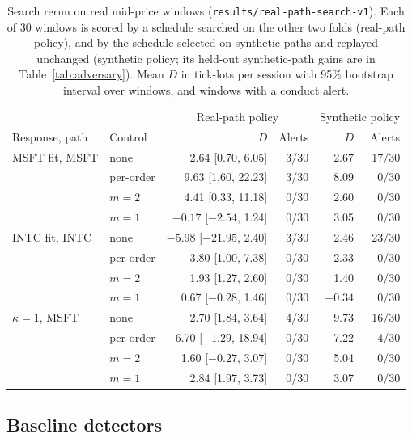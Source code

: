 \documentclass{article}
\begin{document}
\begin{table}[t]
\centering
\caption{Search rerun on real mid-price windows (\texttt{results/real-path-search-v1}). Each of 30 windows is scored by a schedule searched on the other two folds (real-path policy), and by the schedule selected on synthetic paths and replayed unchanged (synthetic policy; its held-out synthetic-path gains are in Table~\ref{tab:adversary}). Mean $D$ in tick-lots per session with 95\% bootstrap interval over windows, and windows with a conduct alert.}\label{tab:realsearch}
\begin{tabular}{llrrrr}
\toprule
 & & \multicolumn{2}{c}{Real-path policy} & \multicolumn{2}{c}{Synthetic policy} \\
Response, path & Control & $D$ & Alerts & $D$ & Alerts \\
\midrule
MSFT fit, MSFT & none & 2.64 [0.70, 6.05] & 3/30 & 2.67 & 17/30 \\
 & per-order & 9.63 [1.60, 22.23] & 3/30 & 8.09 & 0/30 \\
 & $m = 2$ & 4.41 [0.33, 11.18] & 0/30 & 2.60 & 0/30 \\
 & $m = 1$ & $-0.17$ [$-2.54$, 1.24] & 0/30 & 3.05 & 0/30 \\
INTC fit, INTC & none & $-5.98$ [$-21.95$, 2.40] & 3/30 & 2.46 & 23/30 \\
 & per-order & 3.80 [1.00, 7.38] & 0/30 & 2.33 & 0/30 \\
 & $m = 2$ & 1.93 [1.27, 2.60] & 0/30 & 1.40 & 0/30 \\
 & $m = 1$ & 0.67 [$-0.28$, 1.46] & 0/30 & $-0.34$ & 0/30 \\
$\kappa = 1$, MSFT & none & 2.70 [1.84, 3.64] & 4/30 & 9.73 & 16/30 \\
 & per-order & 6.70 [$-1.29$, 18.94] & 0/30 & 7.22 & 4/30 \\
 & $m = 2$ & 1.60 [$-0.27$, 3.07] & 0/30 & 5.04 & 0/30 \\
 & $m = 1$ & 2.84 [1.97, 3.73] & 0/30 & 3.07 & 0/30 \\
\bottomrule
\end{tabular}
\end{table}

\subsection{Baseline detectors}\label{sec:baselines}
\end{document}
